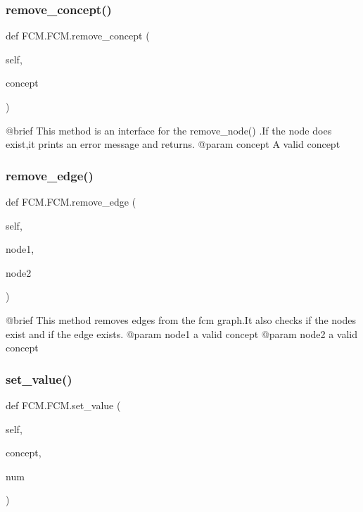 \subsubsection{\texorpdfstring{remove\+\_\+concept()}{remove\_concept()}}
{\footnotesize\ttfamily def F\+C\+M.\+F\+C\+M.\+remove\+\_\+concept (\begin{DoxyParamCaption}\item[{}]{self,  }\item[{}]{concept }\end{DoxyParamCaption})}

\begin{DoxyVerb}@brief This method is an interface for the remove_node() .If the node does exist,it prints an error message and returns.
@param concept A valid concept\end{DoxyVerb}
 \hypertarget{class_f_c_m_1_1_f_c_m_a672188f630f4a42d330f7dc967933054}{}\label{class_f_c_m_1_1_f_c_m_a672188f630f4a42d330f7dc967933054} 
\subsubsection{\texorpdfstring{remove\+\_\+edge()}{remove\_edge()}}
{\footnotesize\ttfamily def F\+C\+M.\+F\+C\+M.\+remove\+\_\+edge (\begin{DoxyParamCaption}\item[{}]{self,  }\item[{}]{node1,  }\item[{}]{node2 }\end{DoxyParamCaption})}

\begin{DoxyVerb}@brief This method removes edges from the fcm graph.It also checks if the nodes exist and if the edge exists.
@param node1 a valid concept
@param node2 a valid concept
\end{DoxyVerb}
 \hypertarget{class_f_c_m_1_1_f_c_m_a55a0daf5c9eecef4639bb15ded281aa5}{}\label{class_f_c_m_1_1_f_c_m_a55a0daf5c9eecef4639bb15ded281aa5} 
\subsubsection{\texorpdfstring{set\+\_\+value()}{set\_value()}}
{\footnotesize\ttfamily def F\+C\+M.\+F\+C\+M.\+set\+\_\+value (\begin{DoxyParamCaption}\item[{}]{self,  }\item[{}]{concept,  }\item[{}]{num }\end{DoxyParamCaption})}

